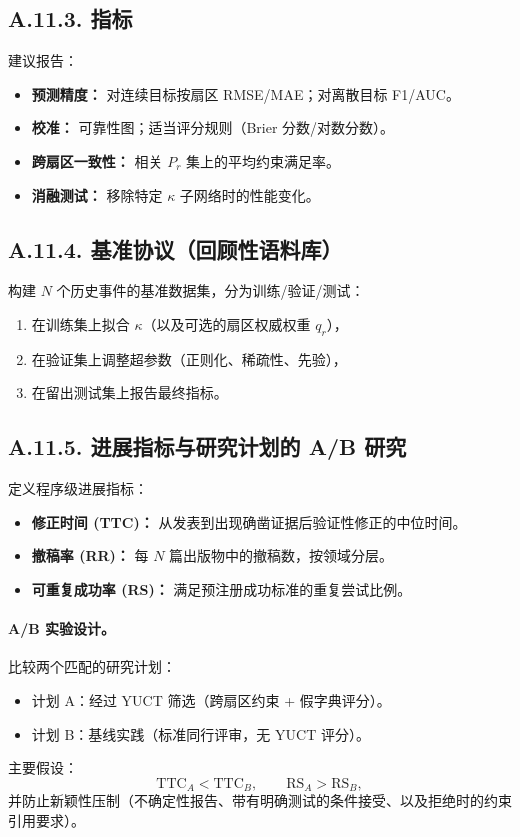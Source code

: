 \documentclass[11pt,a4paper]{article}
\begin{document}
	\subsection*{A.11.3. 指标}
	建议报告：
	\begin{itemize}[leftmargin=*]
		\item \textbf{预测精度：} 对连续目标按扇区 RMSE/MAE；对离散目标 F1/AUC。
		\item \textbf{校准：} 可靠性图；适当评分规则（Brier 分数/对数分数）。
		\item \textbf{跨扇区一致性：} 相关 $P_r$ 集上的平均约束满足率。
		\item \textbf{消融测试：} 移除特定 $\kappa$ 子网络时的性能变化。
	\end{itemize}
	
	\subsection*{A.11.4. 基准协议（回顾性语料库）}
	构建 $N$ 个历史事件的基准数据集，分为训练/验证/测试：
	\begin{enumerate}[leftmargin=*]
		\item 在训练集上拟合 $\kappa$（以及可选的扇区权威权重 $q_r$），
		\item 在验证集上调整超参数（正则化、稀疏性、先验），
		\item 在留出测试集上报告最终指标。
	\end{enumerate}
	
	\subsection*{A.11.5. 进展指标与研究计划的 A/B 研究}
	定义程序级进展指标：
	\begin{itemize}[leftmargin=*]
		\item \textbf{修正时间 (TTC)：} 从发表到出现确凿证据后验证性修正的中位时间。
		\item \textbf{撤稿率 (RR)：} 每 $N$ 篇出版物中的撤稿数，按领域分层。
		\item \textbf{可重复成功率 (RS)：} 满足预注册成功标准的重复尝试比例。
	\end{itemize}
	
	\paragraph{A/B 实验设计。}
	比较两个匹配的研究计划：
	\begin{itemize}[leftmargin=*]
		\item 计划 A：经过 YUCT 筛选（跨扇区约束 + 假字典评分）。
		\item 计划 B：基线实践（标准同行评审，无 YUCT 评分）。
	\end{itemize}
	主要假设：
	$$
	\mathrm{TTC}_A < \mathrm{TTC}_B,\qquad \mathrm{RS}_A > \mathrm{RS}_B,
	$$
	并防止新颖性压制（不确定性报告、带有明确测试的条件接受、以及拒绝时的约束引用要求）。
	
\end{document}
